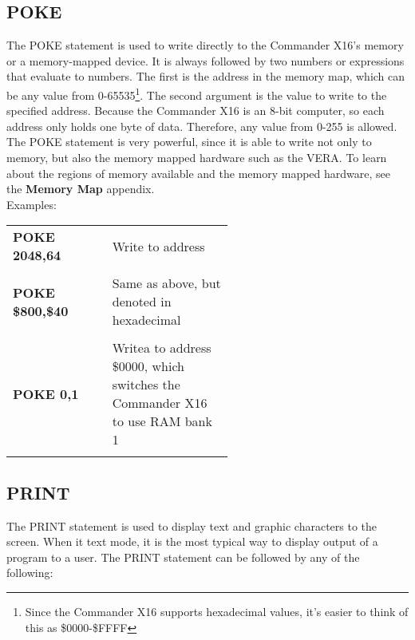\subsection{POKE}

The {\ttfamily POKE} statement is used to write directly to the Commander X16's
memory or a memory-mapped device.  It is always followed by two numbers or
expressions that evaluate to numbers.  The first is the address in the memory
map, which can be any value from 0-65535\footnote{Since the Commander X16
supports hexadecimal values, it's easier to think of this as \$0000-\$FFFF}.
The second argument is the value to write to the specified address.  Because
the Commander X16 is an 8-bit computer, so each address only holds one byte of
data.  Therefore, any value from 0-255 is allowed.\\

The {\ttfamily POKE} statement is very powerful, since it is able to write not
only to memory, but also the memory mapped hardware such as the VERA.  To learn
about the regions of memory available and the memory mapped hardware, see the
{\bfseries Memory Map} appendix.\\

Examples:\\

\begin{tabular}{l p{0.55\linewidth}}

	{\ttfamily\bfseries POKE 2048,64} & Write {\ttfamily 64} to address {\ttfamily 2048}\\\\

	{\ttfamily\bfseries POKE \$800,\$40} & Same as above, but denoted in hexadecimal\\\\

	{\ttfamily\bfseries POKE 0,1} & Writea {\ttfamily 1} to address {\ttfamily
	\$0000}, which switches the Commander X16 to use RAM bank 1\\\\

\end{tabular}

\subsection{PRINT}

The {\ttfamily PRINT} statement is used to display text and graphic characters
to the screen.  When it text mode, it is the most typical way to display output
of a program to a user.  The {\ttfamily PRINT} statement can be followed by any
of the following:\\

